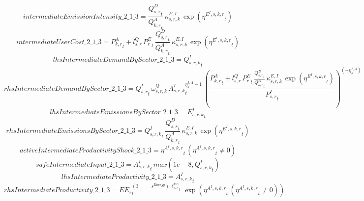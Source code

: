 \begin{dmath*}
intermediateEmissionIntensity\_2\_1\_3 = \frac{{{Q^{D}_{s,r}}}_{t}}{{{Q^{A}_{k,r}}}_{t}}\, {{\kappa^{E,I}_{s,r,k}}}\, \exp\left({{\eta^{E^{I},s,k,r}}}_{t}\right)
\end{dmath*}
\begin{dmath*}
intermediateUserCost\_2\_1\_3 = {{P^{A}_{k,r}}}_{t}+{{l^{Q}_{s,r}}}\, {{P^E_r}}_{t}\, \frac{{{Q^{D}_{s,r}}}_{t}}{{{Q^{A}_{k,r}}}_{t}}\, {{\kappa^{E,I}_{s,r,k}}}\, \exp\left({{\eta^{E^{I},s,k,r}}}_{t}\right)
\end{dmath*}
\begin{dmath*}
lhsIntermediateDemandBySector\_2\_1\_3 = {{Q^{I}_{s,r,k}}}_{t}
\end{dmath*}
\begin{dmath*}
rhsIntermediateDemandBySector\_2\_1\_3 = {{Q^{I}_{s,r}}}_{t}\, {{\omega^{Q}_{s,r,k}}}\, {{A^{I}_{s,r,k}}}_{t}^{{{\eta^{I,A}_{s}}}-1}\, \left(\frac{{{P^{A}_{k,r}}}_{t}+{{l^{Q}_{s,r}}}\, {{P^E_r}}_{t}\, \frac{{{Q^{D}_{s,r}}}_{t}}{{{Q^{A}_{k,r}}}_{t}}\, {{\kappa^{E,I}_{s,r,k}}}\, \exp\left({{\eta^{E^{I},s,k,r}}}_{t}\right)}{{{P^{I}_{s,r}}}_{t}}\right)^{\left(-{{\eta^{I,A}_{s}}}\right)}
\end{dmath*}
\begin{dmath*}
lhsIntermediateEmissionsBySector\_2\_1\_3 = {{E^I_{s,r,k}}}_{t}
\end{dmath*}
\begin{dmath*}
rhsIntermediateEmissionsBySector\_2\_1\_3 = {{Q^{I}_{s,r,k}}}_{t}\, \frac{{{Q^{D}_{s,r}}}_{t}}{{{Q^{A}_{k,r}}}_{t}}\, {{\kappa^{E,I}_{s,r,k}}}\, \exp\left({{\eta^{E^{I},s,k,r}}}_{t}\right)
\end{dmath*}
\begin{dmath*}
activeIntermediateProductivityShock\_2\_1\_3 = {{\eta^{A^{I},s,k,r}}}_{t}\, \left({{\eta^{A^{I},s,k,r}}}_{t}\neq 0\right)
\end{dmath*}
\begin{dmath*}
safeIntermediateInput\_2\_1\_3 = {{A^{I}_{s,r,k}}}_{t}\, max(1e-8,{{Q^{I}_{s,r,k}}}_{t})
\end{dmath*}
\begin{dmath*}
lhsIntermediateProductivity\_2\_1\_3 = {{A^{I}_{s,r,k}}}_{t}
\end{dmath*}
\begin{dmath*}
rhsIntermediateProductivity\_2\_1\_3 = {{EE_r}}_{t}^{\left(3=={{s^{Energy}}}\right)\, {{\ell^{EE}_{s,r}}}_{t}}\, \exp\left({{\eta^{A^{I},s,k,r}}}_{t}\, \left({{\eta^{A^{I},s,k,r}}}_{t}\neq 0\right)\right)
\end{dmath*}

